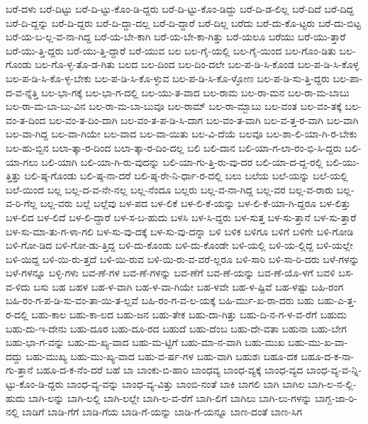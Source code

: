 {ಬರೆ-ದಳು
ಬರೆ-ದಿಟ್ಟು
ಬರೆ-ದಿ-ಟ್ಟು-ಕೊಂ-ಡಿ-ದ್ದರು
ಬರೆ-ದಿ-ಟ್ಟು-ಕೊಂ-ಡಿದ್ದು
ಬರೆ-ದಿ-ಡ-ಲಿಲ್ಲ
ಬರೆ-ದಿದೆ
ಬರೆ-ದಿದ್ದ
ಬರೆ-ದಿ-ದ್ದನ್ನು
ಬರೆ-ದಿ-ದ್ದರು
ಬರೆ-ದಿ-ದ್ದಾ-ದಲ್ಲ
ಬರೆ-ದಿ-ದ್ದಾರೆ
ಬರೆ-ದಿಲ್ಲ
ಬರೆದು
ಬರೆ-ದು-ಕೊ-ಟ್ಟರು
ಬರೆ-ದು-ಬಿಟ್ಟ
ಬರೆ-ಯ-ಬ-ಲ್ಲ-ವ-ನಾ-ಗಿದ್ದ
ಬರೆ-ಯ-ಬೇ-ಕಾಗಿ
ಬರೆ-ಯ-ಬೇ-ಕಾ-ಗಿತ್ತು
ಬರೆ-ಯಲೂ
ಬರೆಯು
ಬರೆ-ಯು-ತ್ತಾರೆ
ಬರೆ-ಯು-ತ್ತಿ-ದ್ದರು
ಬರೆ-ಯು-ತ್ತಿ-ದ್ದಾರೆ
ಬರೆ-ಯುವ
ಬಲ
ಬಲ-ಗೈ-ಯಲ್ಲಿ
ಬಲ-ಗೈ-ಯಿಂದ
ಬಲ-ಗೊಂ-ಡಿತು
ಬಲ-ಗೊಂಡು
ಬಲ-ಗೊ-ಳ್ಳ-ತೊ-ಡ-ಗಿತು
ಬಲದ
ಬಲ-ದಿಂದ
ಬಲ-ದಿಂ-ದಲೇ
ಬಲ-ಪ-ಡಿ-ಸಿ-ಕೊಂಡ
ಬಲ-ಪ-ಡಿ-ಸಿ-ಕೊಳ್ಳ
ಬಲ-ಪ-ಡಿ-ಸಿ-ಕೊ-ಳ್ಳ-ಬೇಕು
ಬಲ-ಪ-ಡಿ-ಸಿ-ಕೊ-ಳ್ಳುವ
ಬಲ-ಪ-ಡಿ-ಸಿ-ಕೊ-ಳ್ಳೋಣ
ಬಲ-ಪ-ಡಿ-ಸು-ತ್ತಿ-ದ್ದರು
ಬಲ-ಪಾ-ದ-ವ-ನ್ನೆತ್ತಿ
ಬಲ-ಭಾ-ಗಕ್ಕೆ
ಬಲ-ಭಾ-ಗ-ದಲ್ಲಿ
ಬಲ-ಯು-ತ-ವಾದ
ಬಲ-ರಾಮ
ಬಲ-ರಾ-ಮನ
ಬಲ-ರಾ-ಮ-ಬಾಬು
ಬಲ-ರಾ-ಮ-ಬಾ-ಬು-ವಿನ
ಬಲ-ರಾ-ಮ-ಬಾ-ಬುವೂ
ಬಲ-ರಾಮ್
ಬಲ-ರಾ-ಮ್ಬಾಬು
ಬಲ-ವಂತ
ಬಲ-ವಂ-ತಕ್ಕೆ
ಬಲ-ವಂ-ತ-ದಿಂದ
ಬಲ-ವಂ-ತ-ದಿಂ-ದಾಗಿ
ಬಲ-ವಂ-ತ-ಪ-ಡಿ-ಸಿ-ದಾಗ
ಬಲ-ವಂ-ತ-ವಾಗಿ
ಬಲ-ವ-ತ್ತ-ರ-ವಾಗಿ
ಬಲ-ವಾಗಿ
ಬಲ-ವಾ-ಗಿದ್ದ
ಬಲ-ವಾ-ಗಿಯೇ
ಬಲ-ವಾದ
ಬಲ-ವಾ-ಯಿತು
ಬಲ-ವಿ-ದೆಯೆ
ಬಲವೂ
ಬಲ-ಶಾ-ಲಿ-ಯಾ-ಗಿ-ರ-ಬೇಕು
ಬಲ-ಹು-ಬ್ಬಿನ
ಬಲಾ-ತ್ಕಾ-ರ-ದಿಂದ
ಬಲಾ-ತ್ಕಾ-ರ-ದಿಂ-ದಲ್ಲ
ಬಲಿ
ಬಲಿ-ದಾನ
ಬಲಿ-ಯಾ-ಗ-ಲಾ-ರಂ-ಭಿ-ಸಿ-ದ್ದರು
ಬಲಿ-ಯಾ-ಗಲು
ಬಲಿ-ಯಾಗಿ
ಬಲಿ-ಯಾ-ಗಿ-ರು-ವುದನ್ನು
ಬಲಿ-ಯಾ-ಗು-ತ್ತಿ-ರು-ವು-ದರ
ಬಲಿ-ಯಾ-ದ-ದ್ದ-ರಲ್ಲಿ
ಬಲಿ-ಯು-ತ್ತಿತ್ತು
ಬಲಿ-ಷ್ಠ-ಗೊಂಡು
ಬಲಿ-ಷ್ಠ-ನಾ-ದರೆ
ಬಲಿ-ಷ್ಠ-ರೇ-ನಿ-ರ್ಧಾ-ರ-ದಲ್ಲಿ
ಬಲು
ಬಲೆಯ
ಬಲೆ-ಯನ್ನು
ಬಲೆ-ಯಲ್ಲಿ
ಬಲೆ-ಯಿಂದ
ಬಲ್ಲ
ಬಲ್ಲ-ದ-ವ-ನೇ-ನಲ್ಲ
ಬಲ್ಲ-ನೆಂದೂ
ಬಲ್ಲರು
ಬಲ್ಲ-ವ-ನಾ-ಗಿದ್ದ
ಬಲ್ಲ-ವರ
ಬಲ್ಲ-ವ-ರಾರು
ಬಲ್ಲ-ವ-ರಿ-ಗೆಲ್ಲ
ಬಲ್ಲ-ವರು
ಬಲ್ಲೆ
ಬಲ್ಲೆವು
ಬಳ-ಪದ
ಬಳ-ಲಿಕೆ
ಬಳ-ಲಿ-ಕೆ-ಯನ್ನು
ಬಳ-ಲಿ-ಕೆ-ಯಾ-ಗಿ-ದ್ದರೂ
ಬಳ-ಲಿತ್ತು
ಬಳ-ಲಿದ
ಬಳ-ಲಿದೆ
ಬಳ-ಲಿ-ದ್ದಾರೆ
ಬಳ-ಸ-ಬ-ಹುದು
ಬಳಸಿ
ಬಳ-ಸಿ-ದ್ದರು
ಬಳ-ಸುತ್ತ
ಬಳ-ಸು-ತ್ತಾನೆ
ಬಳ-ಸು-ತ್ತಾರೆ
ಬಳ-ಸು-ಮಾ-ತು-ಗ-ಳಾ-ಗಲಿ
ಬಳ-ಸು-ವು-ದಕ್ಕೆ
ಬಳ-ಸು-ವು-ದನ್ನಾ
ಬಳಿ
ಬಳಿಕ
ಬಳಿಗೂ
ಬಳಿಗೆ
ಬಳಿಗೇ
ಬಳಿ-ಗೋಡಿ
ಬಳಿ-ಗೋ-ಡಿದ
ಬಳಿ-ಗೋ-ಡು-ತ್ತಿದ್ದ
ಬಳಿ-ದು-ಕೊಂಡು
ಬಳಿ-ದು-ಕೊಂಡೇ
ಬಳಿ-ಯಲ್ಲಿ
ಬಳಿ-ಯ-ಲ್ಲಿದ್ದ
ಬಳಿ-ಯಲ್ಲೇ
ಬಳಿ-ಯಿದ್ದ
ಬಳಿ-ಯಿ-ರು-ತ್ತದೆ
ಬಳಿ-ಯಿ-ರುವ
ಬಳಿ-ಯಿ-ರು-ವ-ವರೆ-ಲ್ಲರೂ
ಬಳಿ-ಸಾರಿ
ಬಳಿ-ಸಾ-ರಿ-ದರು
ಬಳೆ-ಗಳನ್ನು
ಬಳೆ-ಗಳನ್ನೂ
ಬಳ್ಳಿ-ಗಳು
ಬವ-ಣೆ-ಗಳ
ಬವ-ಣೆ-ಗಳನ್ನು
ಬವ-ಣೆಗೆ
ಬವ-ಣೆ-ಯನ್ನು
ಬವ-ಣೆ-ಯೊ-ಳಗೆ
ಬವಳಿ
ಬಸ-ವ-ಳಿದು
ಬಸು
ಬಹ
ಬಹಳ
ಬಹ-ಳ-ವಾಗಿ
ಬಹ-ಳ-ವಾ-ಗಿಯೇ
ಬಹ-ಳವೇ
ಬಹ-ಳ-ಷ್ಟಿವೆ
ಬಹ-ಳಷ್ಟು
ಬಹಿ-ರಂಗ
ಬಹಿ-ರಂ-ಗ-ಪ-ಡಿ-ಸು-ವಂ-ತಾ-ಯಿ-ತ-ಲ್ಲವೆ
ಬಹಿ-ರಂ-ಗ-ವ-ಲ-ಯಕ್ಕೆ
ಬಹಿ-ರ್ಮು-ಖ-ರಾ-ದರು
ಬಹು
ಬಹು-ಎ-ತ್ತ-ರ-ದಲ್ಲಿ
ಬಹು-ಕಾಲ
ಬಹು-ಕಾ-ಲದ
ಬಹು-ಜನ
ಬಹು-ತೇಕ
ಬಹು-ದಾ-ಗಿತ್ತು
ಬಹು-ದಿ-ನ-ಗ-ಳ-ವ-ರೆಗೆ
ಬಹುದು
ಬಹು-ದು-ಇ-ದೇನು
ಬಹು-ದೂರ
ಬಹು-ದೂ-ರದ
ಬಹುದೆ
ಬಹು-ದೆಂಬ
ಬಹು-ದೇ-ವತಾ
ಬಹುನಾ
ಬಹು-ಬೇಗ
ಬಹು-ಭಾ-ಗ-ವನ್ನು
ಬಹು-ಮ-ಖ್ಯ-ವಾದ
ಬಹು-ಮ-ಟ್ಟಿಗೆ
ಬಹು-ಮಾ-ನ-ವಾಗಿ
ಬಹು-ಮುಖ
ಬಹು-ಮು-ಖ-ವಾ-ದದ್ದು
ಬಹು-ಮುಖ್ಯ
ಬಹು-ಮು-ಖ್ಯ-ವಾದ
ಬಹು-ವ-ರ್ಷ-ಗಳ
ಬಹು-ವಾಗಿ
ಬಹುಶಃ
ಬಹೂ-ದಕ
ಬಹೂ-ದ-ಕ-ನಾ-ಗು-ತ್ತಾನೆ
ಬಹೂ-ದ-ಕ-ನೆಂ-ದರೆ
ಬಹೆ
ಬಾ
ಬಾಂಕು-ಬಿ-ಹಾರಿ
ಬಾಂಧವ್ಯ
ಬಾಂಧ-ವ್ಯಕ್ಕೆ
ಬಾಂಧ-ವ್ಯದ
ಬಾಂಧ-ವ್ಯ-ವ-ನ್ನಿ-ಟ್ಟು-ಕೊಂ-ಡಿ-ದ್ದರು
ಬಾಂಧ-ವ್ಯ-ವನ್ನು
ಬಾಂಧ-ವ್ಯ-ವಿತ್ತು
ಬಾಂಬಿ-ನಂತೆ
ಬಾಕಿ
ಬಾಗಲಿ
ಬಾಗಿ
ಬಾಗಿಲ
ಬಾಗಿ-ಲ-ನ-ಲ್ಲಿ-ಹುದು
ಬಾಗಿ-ಲನ್ನು
ಬಾಗಿ-ಲಲ್ಲಿ
ಬಾಗಿ-ಲಲ್ಲೇ
ಬಾಗಿ-ಲ-ವ-ರೆಗೆ
ಬಾಗಿ-ಲಿಗೆ
ಬಾಗಿಲು
ಬಾಗಿ-ಲು-ಗಳನ್ನು
ಬಾಗ್ಬ-ಜಾ-ರಿ-ನಲ್ಲಿ
ಬಾಡಿಗೆ
ಬಾಡಿ-ಗೆಗೆ
ಬಾಡಿ-ಗೆಯ
ಬಾಡಿ-ಗೆ-ಯನ್ನು
ಬಾಡಿ-ಗೆ-ಯನ್ನೂ
ಬಾಣ-ದಂತೆ
ಬಾಣ-ಸಿಗ
}
